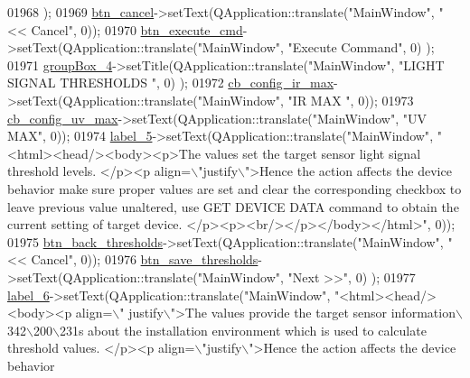 \begin{DoxyCode}
01968         );
01969         \hyperlink{a00080_a26ea4040157d183322b8c1e5d7a55c9f}{btn\_cancel}->setText(QApplication::translate(\textcolor{stringliteral}{"MainWindow"}, \textcolor{stringliteral}{"<< Cancel"}, 0));
01970         \hyperlink{a00080_a9ea50d44e38316e4203933698cbc14a6}{btn\_execute\_cmd}->setText(QApplication::translate(\textcolor{stringliteral}{"MainWindow"}, \textcolor{stringliteral}{"Execute Command"}, 0)
      );
01971         \hyperlink{a00080_ad8a919e5634add9c41bfc319cb9fd338}{groupBox\_4}->setTitle(QApplication::translate(\textcolor{stringliteral}{"MainWindow"}, \textcolor{stringliteral}{"LIGHT SIGNAL THRESHOLDS "}, 0)
      );
01972         \hyperlink{a00080_ae78fd3c777d081ab1ec1d0142bec3320}{cb\_config\_ir\_max}->setText(QApplication::translate(\textcolor{stringliteral}{"MainWindow"}, \textcolor{stringliteral}{"IR MAX "}, 0));
01973         \hyperlink{a00080_a13ce5fddc83683d7b8b717f0b9a4e2cf}{cb\_config\_uv\_max}->setText(QApplication::translate(\textcolor{stringliteral}{"MainWindow"}, \textcolor{stringliteral}{"UV MAX"}, 0));
01974         \hyperlink{a00080_ad6bab8fb8903b8f41afea1218ee52695}{label\_5}->setText(QApplication::translate(\textcolor{stringliteral}{"MainWindow"}, \textcolor{stringliteral}{"<html><head/><body><p>The values set
       the target sensor light signal threshold levels.  </p><p align=\(\backslash\)"justify\(\backslash\)">Hence the action affects the
       device behavior make sure proper values are set and clear the corresponding checkbox to leave previous value
       unaltered, use GET DEVICE DATA command to obtain the current setting of target device.
       </p><p><br/></p></body></html>"}, 0));
01975         \hyperlink{a00080_a5a4e0ac94bd22955cc41bcc276a04278}{btn\_back\_thresholds}->setText(QApplication::translate(\textcolor{stringliteral}{"MainWindow"}, \textcolor{stringliteral}{"<< Cancel"}, 
      0));
01976         \hyperlink{a00080_ac265ae0ccaa1154deaa634d19415f775}{btn\_save\_thresholds}->setText(QApplication::translate(\textcolor{stringliteral}{"MainWindow"}, \textcolor{stringliteral}{"Next >>"}, 0)
      );
01977         \hyperlink{a00080_a663f728e6244926a795c6e6892673b1d}{label\_6}->setText(QApplication::translate(\textcolor{stringliteral}{"MainWindow"}, \textcolor{stringliteral}{"<html><head/><body><p align=\(\backslash\)"
      justify\(\backslash\)">The values provide the target sensor information\(\backslash\)342\(\backslash\)200\(\backslash\)231s about the installation environment which
       is used to calculate threshold values. </p><p align=\(\backslash\)"justify\(\backslash\)">Hence the action affects the device behavior
}
\end{DoxyCode}
